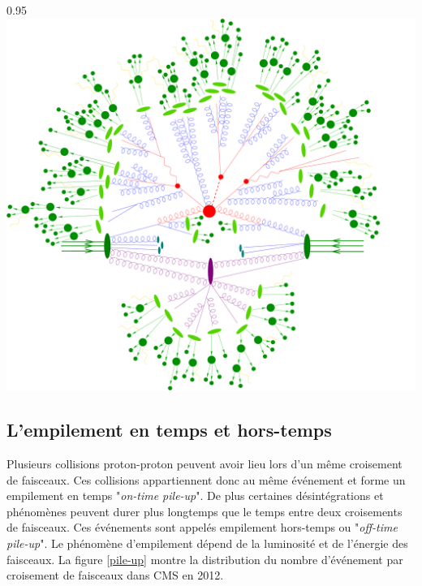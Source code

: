 \begin{minipagewithmarginpars}[ht!]{0.95\textwidth}
	\centering
	\includegraphics[width=1.0\textwidth]{LHC/event.jpg}
	\label{collision2}	
\end{minipagewithmarginpars}

\subsection{L'empilement en temps et hors-temps}
Plusieurs collisions proton-proton peuvent avoir lieu lors d'un même croisement de faisceaux. Ces collisions appartiennent donc au même événement et forme un empilement en temps "\textit{on-time pile-up}". De plus certaines désintégrations et phénomènes peuvent durer plus longtemps que le temps entre deux croisements de faisceaux. Ces événements sont appelés empilement hors-temps ou "\textit{off-time pile-up}". Le phénomène d'empilement dépend de la luminosité et de l'énergie des faisceaux. La figure \ref{pile-up} montre la distribution du nombre d'événement par croisement de faisceaux dans CMS en \num{2012}.


